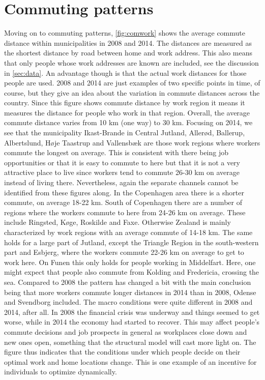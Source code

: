 \section{Commuting patterns}
Moving on to commuting patterns, \autoref{fig:comwork} shows the average commute distance within municipalities in 2008 and 2014. The distances are measured as the shortest distance by road between home and work address. This also means that only people whose work addresses are known are included, see the discussion in \autoref{sec:data}. An advantage though is that the actual work distances for those people are used. 2008 and 2014 are just examples of two specific points in time, of course, but they give an idea about the variation in commute distances across the country. Since this figure shows commute distance by work region it means it measures the distance for people who work in that region. Overall, the average commute distance varies from 10 km (one way) to 30 km. Focusing on 2014, we see that the municipality Ikast-Brande in Central Jutland, Allerød, Ballerup, Albertslund, Høje Taastrup and Vallensbæk are those work regions where workers commute the longest on average. This is consistent with there being job opportunities or that it is easy to commute to here but that it is not a very attractive place to live since workers tend to commute 26-30 km on average instead of living there. Nevertheless, again the separate channels cannot be identified from these figures along. In the Copenhagen area there is a shorter commute, on average 18-22 km. South of Copenhagen there are a number of regions where the workers commute to here from 24-26 km on average. These include Ringsted, Køge, Roskilde and Faxe. Otherwise Zealand is mainly characterized by work regions with an average commute of 14-18 km. The same holds for a large part of Jutland, except the Triangle Region in the south-western part and Esbjerg, where the workers commute 22-26 km on average to get to work here. On Funen this only holds for people working in Middelfart. Here, one might expect that people also commute from Kolding and Fredericia, crossing the sea. Compared to 2008 the pattern has changed a bit with the main conclusion being that more workers commute longer distances in 2014 than in 2008, Odense and Svendborg included. The macro conditions were quite different in 2008 and 2014, after all. In 2008 the financial crisis was underway and things seemed to get worse, while in 2014 the economy had started to recover. This may affect people's commute decisions and job prospects in general as workplaces close down and new ones open, something that the structural model will cast more light on. The figure thus indicates that the conditions under which people decide on their optimal work and home locations change. This is one example of an incentive for individuals to optimize dynamically. 
